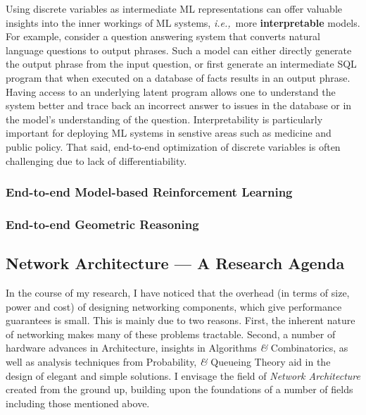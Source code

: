 \documentclass[a4paper, 10pt]{article}
\def\ie{{\em i.e.,}}
\begin{document}
Using discrete variables as intermediate ML representations can offer
valuable insights into the inner workings of ML systems, \ie~more {\bf
  interpretable} models. For example, consider a question answering
system that converts natural language questions to output
phrases. Such a model can either directly generate the output phrase
from the input question, or first generate an intermediate SQL program
that when executed on a database of facts results in an output
phrase. Having access to an underlying latent program allows one to
understand the system better and trace back an incorrect answer to
issues in the database or in the model's understanding of the
question. Interpretability is particularly important for deploying ML
systems in senstive areas such as medicine and public policy. That
said, end-to-end optimization of discrete variables is often
challenging due to lack of differentiability.

\subsubsection*{End-to-end Model-based Reinforcement Learning}
\subsubsection*{End-to-end Geometric Reasoning}

\subsection*{Network Architecture ---  A Research Agenda}

   In the course of my research, I have noticed that the overhead (in terms
of size, power and cost) of designing networking components, which give 
performance guarantees is small. 
This is mainly due to two reasons. First, the inherent nature of 
networking makes many of these problems tractable. Second, a number of
hardware advances in Architecture, insights in Algorithms {\it \&} Combinatorics, 
as well as analysis techniques from Probability, {\it \&} Queueing Theory 
aid in the design of elegant and simple solutions.
I envisage the field of {\it Network Architecture} created from the 
ground up, building upon the foundations of a number of fields
including those mentioned above.

\end{document}
